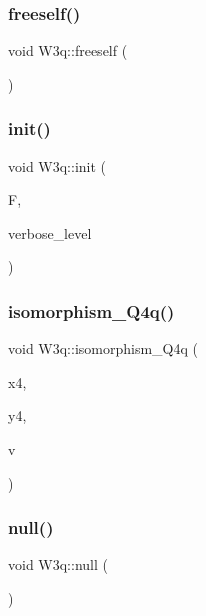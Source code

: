 \subsubsection{\texorpdfstring{freeself()}{freeself()}}
{\footnotesize\ttfamily void W3q\+::freeself (\begin{DoxyParamCaption}{ }\end{DoxyParamCaption})}

\mbox{\label{class_w3q_a215fe070895a4915537fcb1bfba4f777}} 
\subsubsection{\texorpdfstring{init()}{init()}}
{\footnotesize\ttfamily void W3q\+::init (\begin{DoxyParamCaption}\item[{\mbox{\hyperlink{classfinite__field}{finite\+\_\+field}} $\ast$}]{F,  }\item[{\mbox{\hyperlink{galois_8h_a09fddde158a3a20bd2dcadb609de11dc}{I\+NT}}}]{verbose\+\_\+level }\end{DoxyParamCaption})}

\mbox{\label{class_w3q_a734ed96f8ddfcfcae3445df129951bae}} 
\subsubsection{\texorpdfstring{isomorphism\+\_\+\+Q4q()}{isomorphism\_Q4q()}}
{\footnotesize\ttfamily void W3q\+::isomorphism\+\_\+\+Q4q (\begin{DoxyParamCaption}\item[{\mbox{\hyperlink{galois_8h_a09fddde158a3a20bd2dcadb609de11dc}{I\+NT}} $\ast$}]{x4,  }\item[{\mbox{\hyperlink{galois_8h_a09fddde158a3a20bd2dcadb609de11dc}{I\+NT}} $\ast$}]{y4,  }\item[{\mbox{\hyperlink{galois_8h_a09fddde158a3a20bd2dcadb609de11dc}{I\+NT}} $\ast$}]{v }\end{DoxyParamCaption})}

\mbox{\label{class_w3q_a44efdd4625aa1a1c8f4e56a98aca8e3f}} 
\subsubsection{\texorpdfstring{null()}{null()}}
{\footnotesize\ttfamily void W3q\+::null (\begin{DoxyParamCaption}{ }\end{DoxyParamCaption})}



